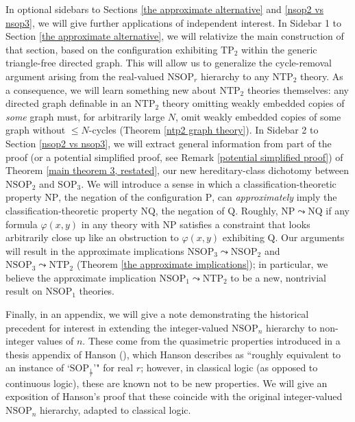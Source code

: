 \documentclass{amsart}
\theoremstyle{definition}
\theoremstyle{remark}
\numberwithin{equation}{section}
\begin{document}
In optional sidebars to Sections \ref{the approximate alternative} and \ref{nsop2 vs nsop3}, we will give further applications of independent interest.  In Sidebar 1 to Section \ref{the approximate alternative}, we will relativize the main construction of that section, based on the configuration exhibiting $\mathrm{TP}_{2}$ within the generic triangle-free directed graph. This will allow us to generalize the cycle-removal argument arising from the real-valued $\mathrm{NSOP}_{r}$ hierarchy to any $\mathrm{NTP}_{2}$ theory. As a consequence, we will learn something new about $\mathrm{NTP}_{2}$ theories themselves: any directed graph definable in an $\mathrm{NTP}_{2}$ theory omitting weakly embedded copies of \textit{some} graph must, for arbitrarily large $N$, omit weakly embedded copies of some graph without $\leq N$-cycles (Theorem \ref{ntp2 graph theory}). In Sidebar 2 to Section \ref{nsop2 vs nsop3}, we will extract general information from part of the proof (or a potential simplified proof, see Remark \ref{potential simplified proof}) of Theorem \ref{main theorem 3, restated}, our new hereditary-class dichotomy between $\mathrm{NSOP}_{2}$ and $\mathrm{SOP}_{3}$. We will introduce a sense in which a classification-theoretic property $\mathrm{NP}$, the negation of the configuration $\mathrm{P}$, can \textit{approximately} imply the classification-theoretic property $\mathrm{NQ}$, the negation of $\mathrm{Q}$. Roughly, $\mathrm{NP} \leadsto \mathrm{NQ}$ if any formula $\varphi(x, y)$ in any theory with $\mathrm{NP}$ satisfies a constraint that looks arbitrarily close up like an obstruction to $\varphi(x, y)$ exhibiting $\mathrm{Q}$. Our arguments will result in the approximate implications $\mathrm{NSOP}_{3} \leadsto \mathrm{NSOP}_{2}$ and $\mathrm{NSOP}_{3} \leadsto \mathrm{NTP}_{2}$ (Theorem \ref{the approximate implications}); in particular, we believe the approximate implication $\mathrm{NSOP}_{1} \leadsto \mathrm{NTP}_{2}$ to be a new, nontrivial result on $\mathrm{NSOP}_{1}$ theories.


Finally, in an appendix, we will give a note demonstrating the historical precedent for interest in extending the integer-valued $\mathrm{NSOP}_{n}$ hierarchy to non-integer values of $n$. These come from the quasimetric properties introduced in a thesis appendix of Hanson (\cite{Hanson2020}), which Hanson describes as ``roughly equivalent to an instance of `$\mathrm{SOP}_{\frac{1}{r}}$'" for real $r$; however, in classical logic (as opposed to continuous logic), these are known not to be new properties. We will give an exposition of Hanson's proof that these coincide with the original integer-valued $\mathrm{NSOP}_{n}$ hierarchy, adapted to classical logic.
\end{document}
